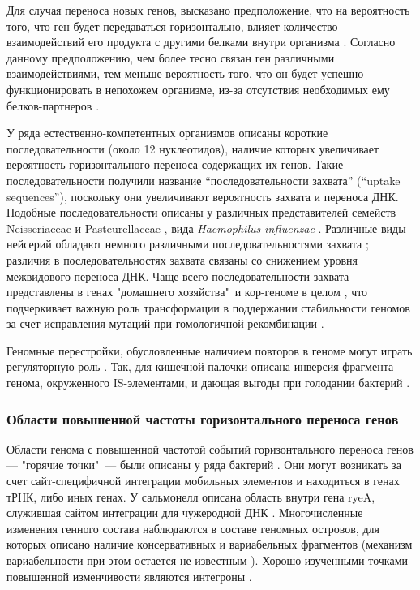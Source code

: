 Для случая переноса новых генов, высказано предположение, что на вероятность того, что ген будет передаваться горизонтально, влияет количество взаимодействий его продукта с другими белками внутри организма \cite{cohen2011complexity}. Согласно данному предположению, чем более тесно связан ген различными взаимодействиями, тем меньше вероятность того, что он будет успешно функционировать в непохожем организме, из-за отсутствия необходимых ему белков-партнеров \cite{novick2020horizontal}.

У ряда естественно-компетентных организмов описаны короткие последовательности (около 12 нуклеотидов), наличие которых увеличивает вероятность горизонтального переноса содержащих их генов. Такие последовательности получили название ``последовательности захвата'' (``uptake sequences''), поскольку они увеличивают вероятность захвата и переноса ДНК. Подобные последовательности описаны у различных представителей семейств Neisseriaceae и Pasteurellaceae \cite{mell2014natural, spencer2016dna}, вида \textit{Haemophilus influenzae} \cite{smith1995frequency}. Различные виды нейсерий обладают немного различными последовательностями захвата \cite{frye2013dialects}; различия в последовательностях захвата связаны со снижением уровня межвидового переноса ДНК. Чаще всего последовательности захвата представлены в генах "домашнего хозяйства"\ и кор-геноме в целом \cite{davidsen2004biased}, что подчеркивает важную роль трансформации в поддержании стабильности геномов за счет исправления мутаций при гомологичной рекомбинации \cite{treangen2008impact}.

Геномные перестройки, обусловленные наличием повторов в геноме могут играть регуляторную роль \cite{смирнов2008механизмы}. Так, для кишечной палочки описана инверсия фрагмента генома, окруженного IS-элементами, и дающая выгоды при голодании бактерий \cite {zinser2003bacterial}.

\subsubsection{Области повышенной частоты горизонтального переноса генов}
Области генома с повышенной частотой событий горизонтального переноса генов --- "горячие точки"\ --- были описаны у ряда бактерий \cite{oliveira2017chromosomal}. Они могут возникать за счет сайт-специфичной интеграции мобильных элементов и находиться в генах тРНК, либо иных генах.  У сальмонелл описана область внутри гена ryeA, служившая сайтом интеграции для чужеродной ДНК \cite{balbontin2008insertion}. Многочисленные изменения генного состава наблюдаются в составе геномных островов, для которых описано наличие консервативных и вариабельных фрагментов \cite{vokes1999aerobactin} (механизм вариабельности при этом остается не известным \cite{myers2006role}). Хорошо изученными точками повышенной изменчивости являются интегроны \cite{boucher2007integrons}. 


